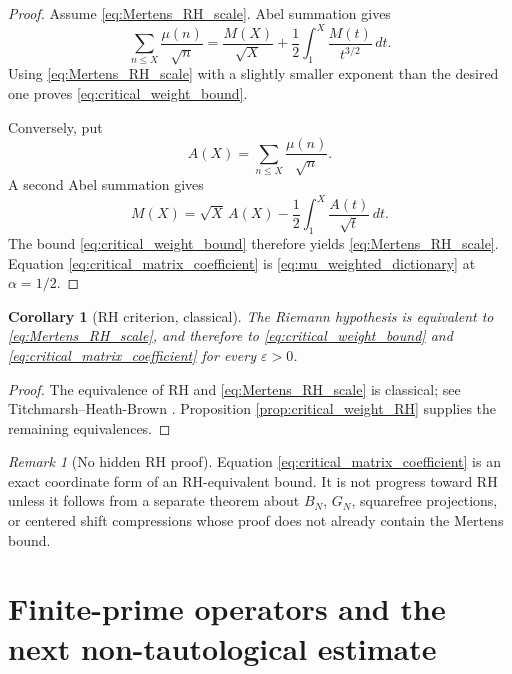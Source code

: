 \documentclass[11pt]{amsart}
\numberwithin{equation}{section}
\theoremstyle{plain}
\newtheorem{corollary}[theorem]{Corollary}
\theoremstyle{definition}
\theoremstyle{remark}
\newtheorem{remark}[theorem]{Remark}
\newcommand{\eps}{\varepsilon}
\newcommand{\mob}{\mu}
\begin{document}
\begin{proof}
Assume \eqref{eq:Mertens_RH_scale}.  Abel summation gives
\begin{equation}
\sum_{n\le X}\frac{\mob(n)}{\sqrt n}
=\frac{M(X)}{\sqrt X}
+\frac12\int_1^X\frac{M(t)}{t^{3/2}}\,dt.
\label{eq:partial_summation_forward}
\end{equation}
Using \eqref{eq:Mertens_RH_scale} with a slightly smaller exponent than the desired one proves \eqref{eq:critical_weight_bound}.

Conversely, put
\begin{equation}
A(X)=\sum_{n\le X}\frac{\mob(n)}{\sqrt n}.
\label{eq:Acritical}
\end{equation}
A second Abel summation gives
\begin{equation}
M(X)=\sqrt X\,A(X)-\frac12\int_1^X\frac{A(t)}{\sqrt t}\,dt.
\label{eq:partial_summation_reverse}
\end{equation}
The bound \eqref{eq:critical_weight_bound} therefore yields \eqref{eq:Mertens_RH_scale}.  Equation \eqref{eq:critical_matrix_coefficient} is \eqref{eq:mu_weighted_dictionary} at $\alpha=1/2$.
\end{proof}

\begin{corollary}[RH criterion, classical]
\label{cor:RH_criterion}
The Riemann hypothesis is equivalent to \eqref{eq:Mertens_RH_scale}, and therefore to \eqref{eq:critical_weight_bound} and \eqref{eq:critical_matrix_coefficient} for every $\eps>0$.
\end{corollary}

\begin{proof}
The equivalence of RH and \eqref{eq:Mertens_RH_scale} is classical; see Titchmarsh--Heath-Brown \cite[Theorem 14.25(c)]{Titchmarsh1986}.  Proposition \ref{prop:critical_weight_RH} supplies the remaining equivalences.
\end{proof}

\begin{remark}[No hidden RH proof]
\label{rem:no_hidden_RH}
Equation \eqref{eq:critical_matrix_coefficient} is an exact coordinate form of an RH-equivalent bound.  It is not progress toward RH unless it follows from a separate theorem about $B_N$, $G_N$, squarefree projections, or centered shift compressions whose proof does not already contain the Mertens bound.
\end{remark}

\section{Finite-prime operators and the next non-tautological estimate}
\label{sec:next_operator}
\end{document}
